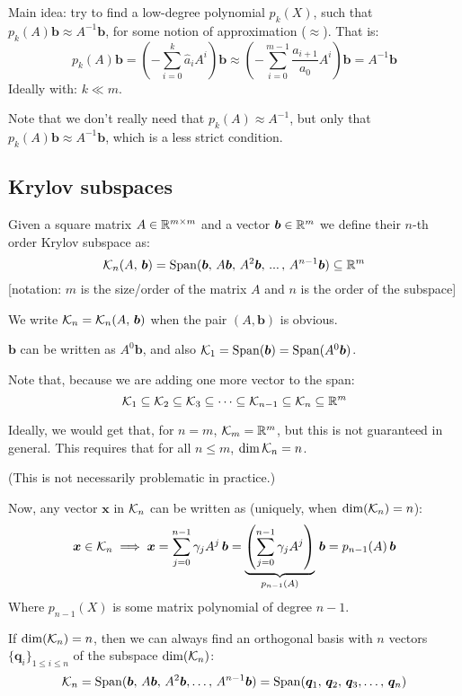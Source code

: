 \documentclass[
  12pt,
  paper=a4,
]{scrartcl} %
\begin{document}
Main idea: try to find a low-degree polynomial $p_k(X)$, such that $p_k(A)\bm b\approx A^{-1}\bm b$, for some notion of approximation ($\approx$). That is:
\[
    p_k(A)\bm b=
     \left(-\sum_{i=0}^{k} \hat{a}_i A^i\right)\bm b
        \approx
    \left(-\sum_{i=0}^{m-1} \frac{a_{i+1}}{a_0} A^{i}\right)\bm b = A^{-1} \bm b
\]
Ideally with: $k \ll m$.

Note that we don't really need that $p_k(A)\approx A^{-1}$, but only that $p_k(A)\bm b\approx A^{-1}\bm b$, which is a less strict condition.

\subsection*{Krylov subspaces}

Given a square matrix $A\in\mathbb R^{m\times m}$ and a vector $\bm b \in \mathbb R^m$ we define their $n$-th order Krylov subspace as:
\[
    \mathcal{K}_n(A,\, \bm b) = \operatorname{Span}(\bm b,\, 
    A\bm b,\,
    A^2\bm b,\,
    ...\,,\,
    A^{n-1}\bm b
    )
    \subseteq \mathbb R^m
\]
[notation: $m$ is the size/order of the matrix $A$ and $n$ is the order of the subspace]

We write $\mathcal{K}_n = \mathcal{K}_n(A,\, \bm b)$ when the pair $(A,\bm b)$ is obvious.

$\bm b$ can be written as $A^0 \bm b$, and also $\mathcal{K}_1 = \operatorname{Span}(\bm b) = \operatorname{Span}(A^0\bm b)$.

Note that, because we are adding one more vector to the span:
\[
    \mathcal{K}_1 \subseteq \mathcal{K}_2 
        \subseteq \mathcal{K}_3
        \subseteq \cdots
        \subseteq \mathcal{K}_{n-1}
        \subseteq \mathcal{K}_{n}
        \subseteq \mathbb R^m
\]

Ideally, we would get that, for $n=m$, $\mathcal{K}_{m} = \mathbb R^m$, but this is not guaranteed in general. This requires that for all $n\le m$, $\dim \mathcal{K}_{n} = n$.

(This is not necessarily problematic in practice.)

Now, any vector $\bm x$ in $\mathcal{K}_n$ can be written as (uniquely, when $\dim(\mathcal{K}_n)=n$):
\[
    \bm x \in \mathcal{K}_n \implies
        \bm x = \sum_{j=0}^{n-1}\gamma_j A^j \,  \bm b
    =
        \underbrace{
            \left(\sum_{j=0}^{n-1}\gamma_j A^j \right)
        }_{p_{n-1}(A)}
        \,\bm b
    =
        {p_{n-1}(A)}
        \,\bm b
\]
Where ${p_{n-1}(X)}$ is some matrix polynomial of degree $n-1$.

If $\dim(\mathcal{K}_n) = n$, then we can always find an orthogonal basis with $n$ vectors $\{\bm q_i\}_{1\le i\le n}$ of the subspace $\dim(\mathcal{K}_n)$:
\[
    \mathcal{K}_n
        = \operatorname{Span}(\bm b,\, A\bm b,\, A^2\bm b, \dots ,\, A^{n-1} \bm b)
        = \operatorname{Span}(\bm q_1,\,\bm q_2,\,\bm q_3, \dots ,\,\bm q_n)
\]
\end{document}
